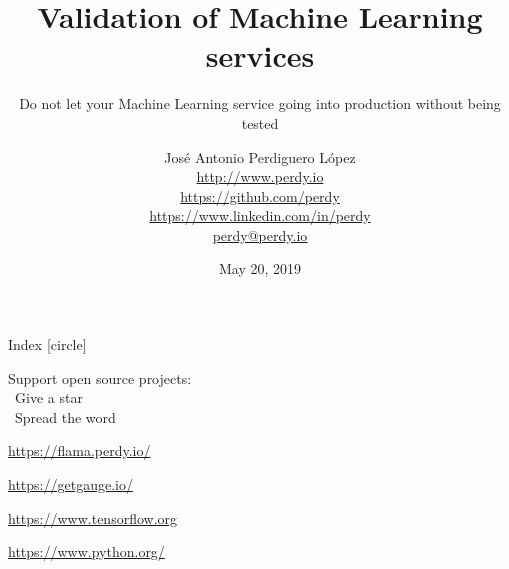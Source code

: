 \documentclass[final, 9pt, svgnames, xcolor=table]{beamerPerdy}
\title{Validation of Machine Learning services}
\subtitle{Do not let your Machine Learning service going into production without being tested}
\author[J. A. Perdiguero López]{
José Antonio Perdiguero López\\
\href{http://www.perdy.io}{\scriptsize{\faGlobe\; http://www.perdy.io}}\\
\href{https://github.com/perdy}{\scriptsize{\faGithub\; https://github.com/perdy}}\\
\href{https://www.linkedin.com/in/perdy}{\scriptsize{\faLinkedin\; https://www.linkedin.com/in/perdy}}\\
\href{mailto://perdy@perdy.io}{\scriptsize{\faAt\; perdy@perdy.io}}}
\institute[Piksel]{Software Architect @ Piksel}
\date{May 20, 2019}
\begin{document}
\begin{frame}
\end{frame}

\begin{frame}
    \titlepage
\end{frame}

\begin{frame}{Index}
    [circle]
    \tableofcontents
\end{frame}






\begin{frame}[standout]
    \Huge{Support open source projects: \\ \faStar \, Give a star\\ \faBullhorn \, Spread the word}

    \qquad

    \href{https://flama.perdy.io}{https://flama.perdy.io/}

    \href{https://getgauge.io/}{https://getgauge.io/}

    \href{https://www.tensorflow.org/}{https://www.tensorflow.org}

    \href{https://www.python.org/}{https://www.python.org/}
\end{frame}
\end{document}
